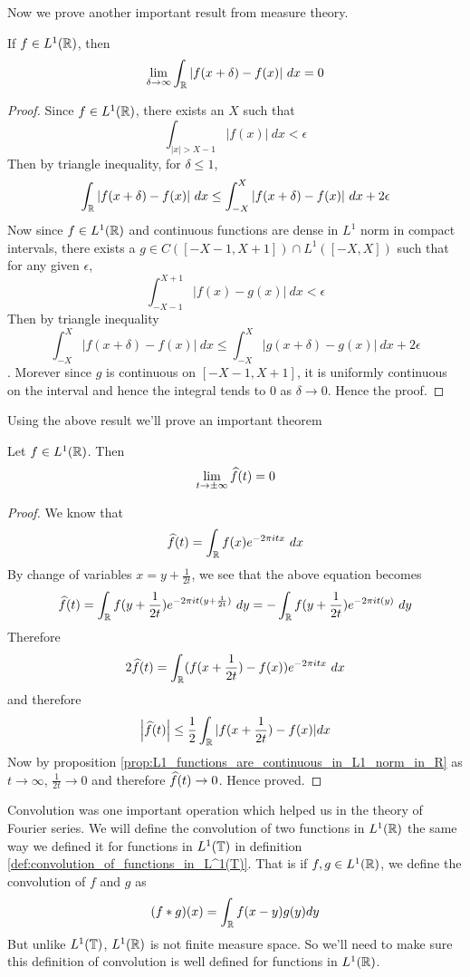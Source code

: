   Now we prove another important result from measure theory.
  \begin{proposition}
    \label{prop:L1_functions_are_continuous_in_L1_norm_in_R}
    If $f \in L^1(\mathbb R)$, then $$\lim_{\delta \to \infty} \int_\mathbb R |f(x+\delta) - f(x)| \ dx = 0$$
  \end{proposition}
  \begin{proof}
    Since $f\in L^1(\mathbb R)$, there exists an $X$ such that $$\int_{|x|>X-1} |f(x)| \ dx < \epsilon$$
    Then by triangle inequality, for $\delta \le 1$, $$\int_\mathbb R |f(x+\delta) - f(x)| \ dx \le \int_{-X}^X |f(x+\delta) - f(x)| \ dx + 2\epsilon$$
    Now since $f \in L^1(\mathbb R)$ and continuous functions are dense in $L^1$ norm in compact intervals, there exists a $g \in C([-X-1, X+1]) \cap L^1([-X, X])$ such that for any given $\epsilon$, $$\int_{-X-1}^{X+1} |f(x) - g(x)| \ dx < \epsilon$$
    Then by triangle inequality $$\int_{-X}^X |f(x+\delta) - f(x)| \ dx \le \int_{-X}^X |g(x+\delta) - g(x)| \ dx + 2\epsilon$$. Morever since $g$ is continuous on $[-X-1, X+1]$, it is uniformly continuous on the interval and hence the integral tends to $0$ as $\delta \to 0$. Hence the proof.
  \end{proof}

  Using the above result we'll prove an important theorem
  \begin{theorem}
    Let $f \in L^1(\mathbb R)$. Then $$\lim_{t \to \pm \infty} \widehat{f}(t) = 0$$
  \end{theorem}
  \begin{proof}
    We know that $$\widehat{f}(t) = \int_\mathbb R f(x)e^{-2 \pi itx} \ dx $$
    By change of variables $x = y + \frac{1}{2t}$, we see that the above equation becomes $$\widehat{f}(t) = \int_\mathbb R f(y + \frac{1}{2t})e^{-2 \pi it(y+ \frac{1}{2t})} \ dy = -\int_\mathbb R f(y + \frac{1}{2t})e^{-2 \pi it(y)} \ dy  $$
    Therefore $$2\widehat{f}(t) = \int_\mathbb R (f(x + \frac{1}{2t}) - f(x))e^{-2 \pi itx} \ dx $$
    and therefore $$\left|\widehat{f}(t)\right| \le \frac{1}{2} \int_\mathbb R |f(x + \frac{1}{2t}) - f(x)| dx$$
    Now by proposition \ref{prop:L1_functions_are_continuous_in_L1_norm_in_R} as $t \to \infty$, $\frac{1}{2t} \to 0$ and therefore $\widehat{f}(t) \to 0$. Hence proved. 
  \end{proof}

  Convolution was one important operation which helped us in the theory of Fourier series. We will define the convolution of two functions in $L^1(\mathbb R)$ the same way we defined it for functions in $L^1(\mathbb T)$ in definition \ref{def:convolution_of_functions_in_L^1(T)}. That is if $f, g \in L^1(\mathbb R)$, we define the convolution of $f$ and $g$ as $$(f*g)(x) = \int_{\mathbb R} f(x-y)g(y) dy$$
  But unlike $L^1(\mathbb T)$, $L^1(\mathbb R)$ is not finite measure space. So we'll need to make sure this definition of convolution is well defined for functions in $L^1(\mathbb R)$. 

